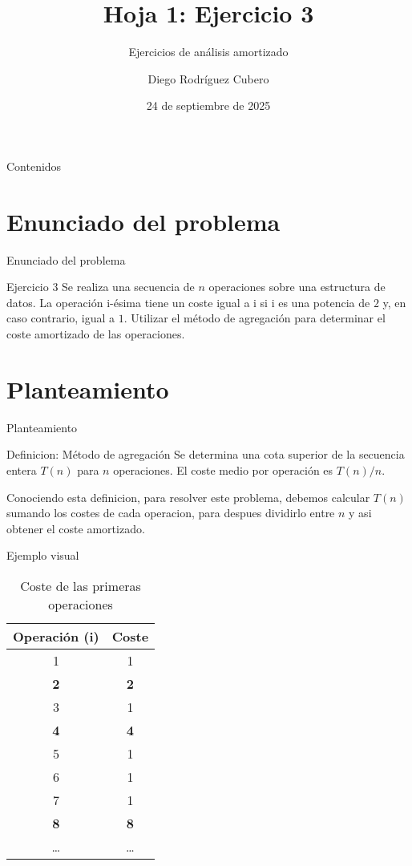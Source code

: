 \documentclass[aspectratio=169]{beamer}
\title{Hoja 1: Ejercicio 3}
\subtitle{Ejercicios de análisis amortizado}
\author{Diego Rodríguez Cubero}
\institute{UCM}
\date{24 de septiembre de 2025}
\begin{document}
\begin{frame}
    \titlepage
\end{frame}

\begin{frame}{Contenidos}
    \tableofcontents
\end{frame}

\section{Enunciado del problema}
\begin{frame}{Enunciado del problema}
    \begin{block}{Ejercicio 3}
        Se realiza una secuencia de $n$ operaciones sobre una estructura de datos. La operación i-ésima tiene un coste igual a i si i es una potencia de $2$ y, en caso contrario, igual a $1$. Utilizar el método de agregación para determinar el coste amortizado de las operaciones.
    \end{block}
\end{frame}

\section{Planteamiento}
\begin{frame}{Planteamiento}
    \begin{exampleblock}{Definicion: Método de agregación}
        Se determina una cota superior de la secuencia entera $T(n)$ para $n$ operaciones. El coste medio por operación es $T(n)/n$.
    \end{exampleblock}
    Conociendo esta definicion, para resolver este problema, debemos calcular $T(n)$ sumando los costes de cada operacion, para despues dividirlo entre $n$ y asi obtener el coste amortizado.
\end{frame}

\begin{frame}{Ejemplo visual}
    \begin{table}
        \centering
        \begin{tabular}{|c|c|}
            \hline
            \textbf{Operación (i)} & \textbf{Coste} \\
            \hline
            1 & 1 \\
            \textbf{2} & \textbf{2} \\
            3 & 1 \\
            \textbf{4} & \textbf{4} \\
            5 & 1 \\
            6 & 1 \\
            7 & 1 \\
            \textbf{8} & \textbf{8} \\
            \ldots & \ldots \\
            \hline
        \end{tabular}
        \caption{Coste de las primeras operaciones}
    \end{table}
\end{frame}
\end{document}
